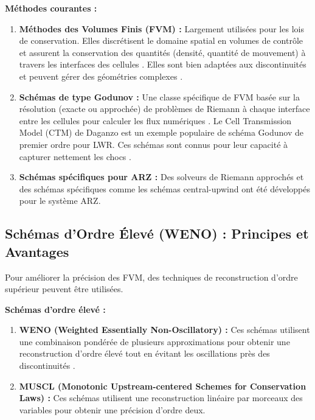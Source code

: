 \textbf{Méthodes courantes :}

\begin{enumerate}
    \item \textbf{Méthodes des Volumes Finis (FVM) :} Largement utilisées pour les lois de conservation. Elles discrétisent le domaine spatial en volumes de contrôle et assurent la conservation des quantités (densité, quantité de mouvement) à travers les interfaces des cellules \cite{FanWork2015}. Elles sont bien adaptées aux discontinuités et peuvent gérer des géométries complexes \cite{FanWork2015, FanHertySeibold2014}.
    \item \textbf{Schémas de type Godunov :} Une classe spécifique de FVM basée sur la résolution (exacte ou approchée) de problèmes de Riemann à chaque interface entre les cellules pour calculer les flux numériques \cite{MammarEtAl2009}. Le Cell Transmission Model (CTM) de Daganzo est un exemple populaire de schéma Godunov de premier ordre pour LWR. Ces schémas sont connus pour leur capacité à capturer nettement les chocs \cite{FanWork2015}.
    \item \textbf{Schémas spécifiques pour ARZ :} Des solveurs de Riemann approchés \cite{ZhangEtAl2003} et des schémas spécifiques comme les schémas central-upwind \cite{Giorgi2002} ont été développés pour le système ARZ.
\end{enumerate}


\subsection{Schémas d'Ordre Élevé (WENO) : Principes et Avantages}
Pour améliorer la précision des FVM, des techniques de reconstruction d'ordre supérieur peuvent être utilisées.

\textbf{Schémas d'ordre élevé :}

\begin{enumerate}
    \item \textbf{WENO (Weighted Essentially Non-Oscillatory) :} Ces schémas utilisent une combinaison pondérée de plusieurs approximations pour obtenir une reconstruction d'ordre élevé tout en évitant les oscillations près des discontinuités \cite{Giorgi2002}.
    \item \textbf{MUSCL (Monotonic Upstream-centered Schemes for Conservation Laws) :} Ces schémas utilisent une reconstruction linéaire par morceaux des variables pour obtenir une précision d'ordre deux.
\end{enumerate}

